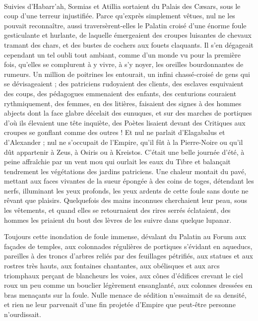 \documentclass[a4paper, 11pt, oneside, polutonikogreek, french]{article}
\begin{document}
\paragraph{}
Suivies d'Habarr'ah, Sœmias et Atillia sortaient du Palais des Cæsars, sous le coup d'une terreur injustifiée. Parce qu'exprès simplement vêtues, nul ne les pouvait reconnaître, aussi traversèrent-elles le Palatin croisé d'une énorme foule gesticulante et hurlante, de laquelle émergeaient des croupes luisantes de chevaux tramant des chars, et des bustes de cochers aux fouets claquants. Il s'en dégageait cependant un tel oubli tout ambiant, comme d'un monde vu pour la première fois, qu'elles se complurent à y vivre, à s'y noyer, les oreilles bourdonnantes de rumeurs. Un million de poitrines les entourait, un infini chassé-croisé de gens qui se dévisageaient ; des patriciens rudoyaient des clients, des esclaves esquivaient des coups, des pédagogues emmenaient des enfants, des centurions couraient rythmiquement, des femmes, en des litières, faisaient des signes à des hommes abjects dont la face glabre décelait des eunuques, et sur des marches de portiques d'où ils élevaient une tête inquiète, des Poètes lisaient devant des Critiques aux croupes se gonflant comme des outres ! Et nul ne parlait d'Elagabalus et d'Alexander ; nul ne s'occupait de l'Empire, qu'il fût à la Pierre-Noire ou qu'il dût appartenir à Zeus, à Osiris ou à Kreistos. C'était une belle journée d'été, à peine affraîchie par un vent mou qui ourlait les eaux du Tibre et balançait tendrement les végétations des jardins patriciens. Une chaleur montait du pavé, mettant aux faces vivantes de la sueur épongée à des coins de toges, détendant les nerfs, illuminant les yeux profonds, les yeux ardents de cette foule sans doute ne rêvant que plaisirs. Quelquefois des mains inconnues cherchaient leur peau, sous les vêtements, et quand elles se retournaient des rires serrés éclataient, des hommes les priaient du bout des lèvres de les suivre dans quelque lupanar.

Toujours cette inondation de foule immense, dévalant du Palatin au Forum aux façades de temples, aux colonnades régulières de portiques s'évidant en aqueducs, pareilles à des troncs d'arbres reliés par des feuillages pétrifiés, aux statues et aux rostres très hauts, aux fontaines chantantes, aux obélisques et aux arcs triomphaux perçant de blancheurs les voies, aux cônes d'édifices crevant le ciel roux un peu comme un bouclier légèrement ensanglanté, aux colonnes dressées en bras menaçants sur la foule. Nulle menace de sédition n'essaimait de sa densité, et rien ne leur parvenait d'une fin projetée d'Empire que peut-être personne n'ourdissait.
\end{document}
